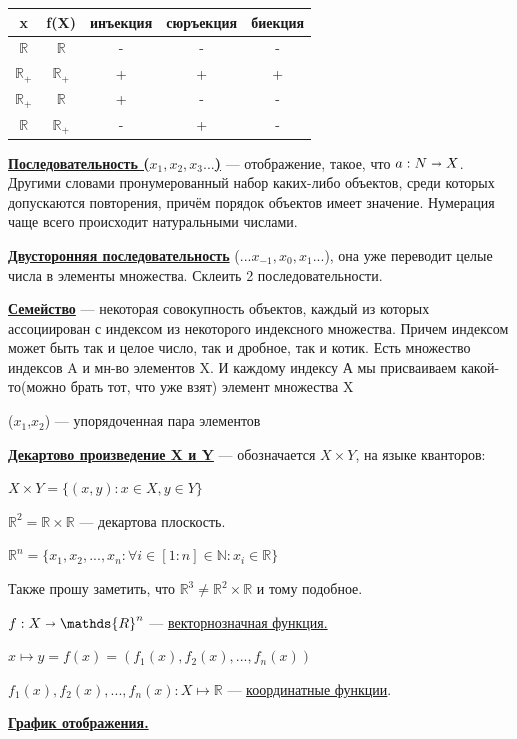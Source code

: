 \documentclass{article}
\newcommand{\deff}[1]{\underline{\textbf{#1}}}
\begin{document}
\begin{tabular}{ |c|c|c|c|c|  }
 \hline
 x & f(X) & инъекция & сюръекция & биекция\\
 \hline
 $\mathds{R}$ & $\mathds{R}$ & - & - & -\\
 \hline
  $\mathds{R}_+$ & $\mathds{R}_+$ & + & + & +\\
 \hline
 $\mathds{R}_+$ & $\mathds{R}$ & + & - & -\\
 \hline
 $\mathds{R}$ & $\mathds{R}_+$ & - & + & -\\
 \hline
\end{tabular}


\deff{Последовательность ($x_1,x_2,x_3...$)}  --- отображение, такое, что $a:N \shortrightarrow X$. Другими словами пронумерованный набор каких-либо объектов, среди которых допускаются повторения, причём порядок объектов имеет значение. Нумерация чаще всего происходит натуральными числами.

\deff{Двусторонняя последовательность} ($...x_{-1},x_0,x_1...$), она уже переводит целые числа в элементы множества. Склеить 2 последовательности.

\deff{Семейство} --- некоторая совокупность объектов, каждый из которых ассоциирован с индексом из некоторого индексного множества. Причем индексом может быть так и целое число, так и дробное, так и котик. Есть множество индексов A и мн-во элементов X. И каждому индексу А мы присваиваем какой-то(можно брать тот, что уже взят) элемент множества X

($x_1$,$x_2$) ---  упорядоченная пара элементов

\deff{Декартово произведение X и Y} --- обозначается $X \times Y$, на языке кванторов:

 $X \times Y = \{(x,y):x \in X, y \in Y\}$ 

 $\mathds{R}^{2} = \mathds{R}\times \mathds{R}$ --- декартова плоскость.

 $\mathds{R}^{n} = \{x_1,x_2,...,x_n: \forall i \in [1:n] \in \mathds{N}:x_i \in \mathds{R}\}$

Также прошу заметить, что 
 $\mathds{R}^{3} \neq \mathds{R}^2 \times \mathds{R}$ и тому подобное.

$f: X \shortrightarrow \mathds{R}^{n} $ --- \uline{векторнозначная функция.}

$x \mapsto y = f(x) = (f_1(x),f_2(x),...,f_n(x))$

$f_1(x),f_2(x),...,f_n(x): X \mapsto \mathds{R}$ --- \uline{координатные функции}.

\deff{График отображения.} 
\end{document}
